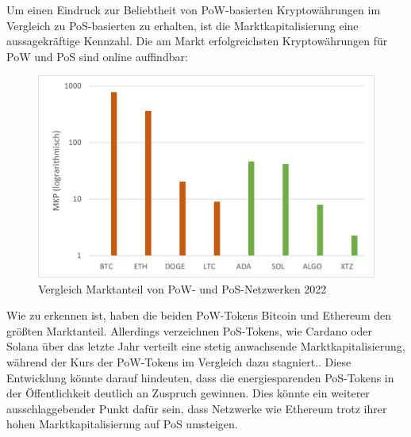 Um einen Eindruck zur Beliebtheit von PoW-basierten Kryptowährungen im Vergleich zu PoS-basierten zu erhalten, ist die Marktkapitalisierung eine aussagekräftige Kennzahl. Die am Markt erfolgreichsten Kryptowährungen für PoW und PoS  sind online auffindbar:
\FloatBarrier
\begin{figure}[ht!]
    \centering
    \includegraphics[width=.75\textwidth]{quellen/mkp_pow_pos.png}
    \caption{Vergleich Marktanteil von PoW- und PoS-Netzwerken 2022}
\end{figure}
\FloatBarrier
\noindent Wie zu erkennen ist, haben die beiden PoW-Tokens Bitcoin und Ethereum den größten Marktanteil. Allerdings verzeichnen PoS-Tokens, wie Cardano oder Solana über das letzte Jahr verteilt eine stetig anwachsende Marktkapitalisierung, während der Kurs der PoW-Tokens im Vergleich dazu stagniert.. Diese Entwicklung könnte darauf hindeuten, dass die energiesparenden PoS-Tokens in der Öffentlichkeit deutlich an Zuspruch gewinnen. Dies könnte ein weiterer ausschlaggebender Punkt dafür sein, dass Netzwerke wie Ethereum trotz ihrer hohen Marktkapitalisierung auf PoS umsteigen.